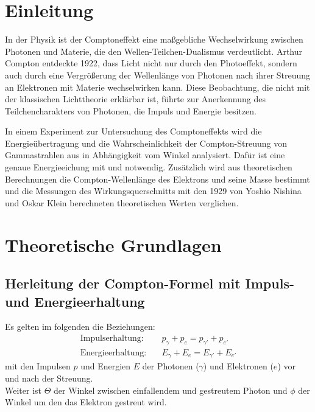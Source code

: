 \documentclass[12pt,a4paper,ngerman]{report}
\begin{document}
\begin{titlepage}
	\end{titlepage}

	\setcounter{secnumdepth}{3}
	\setcounter{tocdepth}{4}
	\tableofcontents



	\chapter*{Einleitung}
            In der Physik ist der Comptoneffekt eine maßgebliche Wechselwirkung zwischen Photonen und Materie, die den Wellen-Teilchen-Dualismus verdeutlicht. Arthur Compton entdeckte 1922, dass Licht nicht nur durch den Photoeffekt, sondern auch durch eine Vergrößerung der Wellenlänge von Photonen nach ihrer Streuung an Elektronen mit Materie wechselwirken kann. Diese Beobachtung, die nicht mit der klassischen Lichttheorie erklärbar ist, führte zur Anerkennung des Teilchencharakters von Photonen, die Impuls und Energie besitzen.

            In einem Experiment zur Untersuchung des Comptoneffekts wird die Energieübertragung und die Wahrscheinlichkeit der Compton-Streuung von Gammastrahlen aus  in Abhängigkeit vom Winkel analysiert. Dafür ist eine genaue Energieeichung mit  und  notwendig. Zusätzlich wird aus theoretischen Berechnungen die Compton-Wellenlänge des Elektrons und seine Masse bestimmt und die Messungen des Wirkungsquerschnitts mit den 1929 von Yoshio Nishina und Oskar Klein berechneten theoretischen Werten verglichen.


    \chapter{Theoretische Grundlagen}
    	\section{Herleitung der Compton-Formel mit Impuls- und Energieerhaltung}
        	Es gelten im folgenden die Beziehungen:
				\begin{align}
					\text{Impulserhaltung:} & \quad p_{\gamma} + p_e = p_{\gamma'} + p_{e'} \label{eq:Impulserhaltung} \\
					\text{Energieerhaltung:} & \quad E_{\gamma} + E_e = E_{\gamma'} + E_{e'} \label{eq:Energieerhaltung}
				\end{align}
			mit den Impulsen $p$ und Energien $E$ der Photonen ($\gamma$) und Elektronen ($e$) vor und nach der Streuung.\\
			Weiter ist $\Theta$ der Winkel zwischen einfallendem und gestreutem Photon und $\phi$ der Winkel um den das Elektron gestreut wird.\\
\end{document}
